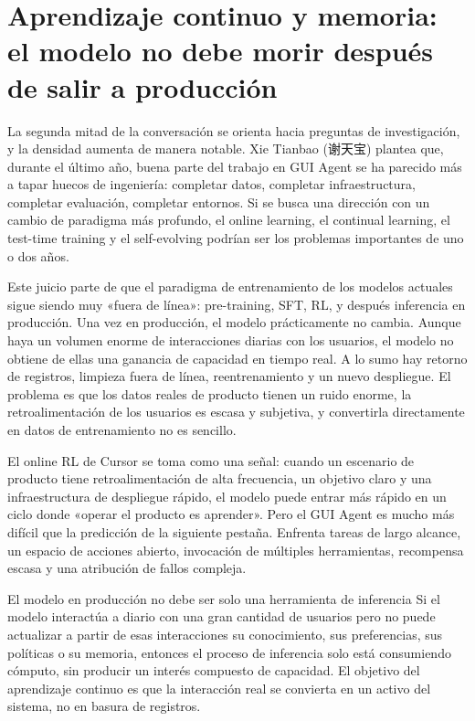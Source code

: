 \section{Aprendizaje continuo y memoria: el modelo no debe morir después de salir a producción}

La segunda mitad de la conversación se orienta hacia preguntas de investigación, y la densidad aumenta de manera notable. Xie Tianbao (谢天宝) plantea que, durante el último año, buena parte del trabajo en GUI Agent se ha parecido más a tapar huecos de ingeniería: completar datos, completar infraestructura, completar evaluación, completar entornos. Si se busca una dirección con un cambio de paradigma más profundo, el online learning, el continual learning, el test-time training y el self-evolving podrían ser los problemas importantes de uno o dos años.

Este juicio parte de que el paradigma de entrenamiento de los modelos actuales sigue siendo muy «fuera de línea»: pre-training, SFT, RL, y después inferencia en producción. Una vez en producción, el modelo prácticamente no cambia. Aunque haya un volumen enorme de interacciones diarias con los usuarios, el modelo no obtiene de ellas una ganancia de capacidad en tiempo real. A lo sumo hay retorno de registros, limpieza fuera de línea, reentrenamiento y un nuevo despliegue. El problema es que los datos reales de producto tienen un ruido enorme, la retroalimentación de los usuarios es escasa y subjetiva, y convertirla directamente en datos de entrenamiento no es sencillo.

El online RL de Cursor se toma como una señal: cuando un escenario de producto tiene retroalimentación de alta frecuencia, un objetivo claro y una infraestructura de despliegue rápido, el modelo puede entrar más rápido en un ciclo donde «operar el producto es aprender». Pero el GUI Agent es mucho más difícil que la predicción de la siguiente pestaña. Enfrenta tareas de largo alcance, un espacio de acciones abierto, invocación de múltiples herramientas, recompensa escasa y una atribución de fallos compleja.

\begin{importantbox}{El modelo en producción no debe ser solo una herramienta de inferencia}
Si el modelo interactúa a diario con una gran cantidad de usuarios pero no puede actualizar a partir de esas interacciones su conocimiento, sus preferencias, sus políticas o su memoria, entonces el proceso de inferencia solo está consumiendo cómputo, sin producir un interés compuesto de capacidad. El objetivo del aprendizaje continuo es que la interacción real se convierta en un activo del sistema, no en basura de registros.
\end{importantbox}

